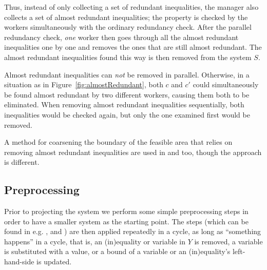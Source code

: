 Thus, instead of only collecting a set of redundant inequalities, the manager also collects a set of almost redundant inequalities; the property is checked by the workers simultaneously with the ordinary redundancy check. After the parallel redundancy check, \emph{one} worker then goes through all the almost redundant inequalities one by one and removes the ones that are still almost redundant. The almost redundant inequalities found this way is then removed from the system $S$.  

Almost redundant inequalities can \emph{not} be removed in parallel. Otherwise, in a situation as in Figure~\ref{fig:almostRedundant}, both $c$ and $c'$ could simultaneously be found almost redundant by two different workers, causing them both to be eliminated. When removing almost redundant inequalities sequentially, both inequalities would be checked again, but only the one examined first would be removed.

A method for coarsening the boundary of the feasible area that relies on removing almost redundant inequalities are used in \cite{lukatskii08} and \cite{shapot12} too, though the approach is different.

\subsection*{Preprocessing}
Prior to projecting the system we perform some simple preprocessing steps in order to have a smaller system as the starting point. The steps (which can be found in e.g. \cite{brearley75}, \cite{andersen95} and \cite{maros})
are then applied repeatedly in a cycle, as long as ``something happens'' in a cycle, that is, an (in)equality or variable in $Y$ is removed, a variable is substituted with a value, or a bound of a variable or an (in)equality's left-hand-side is updated.


